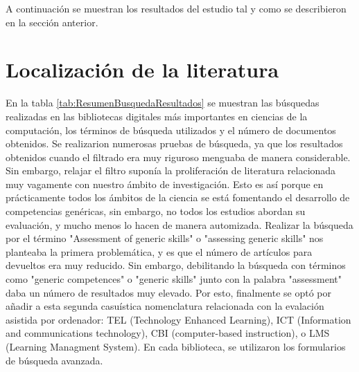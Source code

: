 


A continuación se muestran los resultados del estudio tal y como se describieron en la sección anterior.

\section{Localización de la literatura}
En la tabla \ref{tab:ResumenBusquedaResultados} se muestran las búsquedas realizadas en las bibliotecas digitales más importantes en ciencias de la computación, los términos de búsqueda utilizados y el número de documentos obtenidos. Se realizarion numerosas pruebas de búsqueda, ya que los resultados obtenidos cuando el filtrado era muy riguroso menguaba de manera considerable. Sin embargo, relajar el filtro suponía la proliferación de literatura relacionada muy vagamente con nuestro ámbito de investigación. Esto es así porque en prácticamente todos los ámbitos de la ciencia se está fomentando el desarrollo de competencias genéricas, sin embargo, no todos los estudios abordan su evaluación, y mucho menos lo hacen de manera automizada. Realizar la búsqueda por el término "Assessment of generic skills" o "assessing generic skills" nos planteaba la primera problemática, y es que el número de artículos para devueltos era muy reducido. Sin embargo, debilitando la búsqueda con términos como "generic competences" o "generic skills" junto con la palabra "assessment" daba un número de resultados muy elevado. Por esto, finalmente se optó por añadir a esta segunda casuística nomenclatura relacionada con la evalación asistida por ordenador: TEL (Technology Enhanced Learning), ICT (Information and communications technology), CBI (computer-based instruction), o LMS (Learning Managment System). En cada biblioteca, se utilizaron los formularios de búsqueda avanzada.


